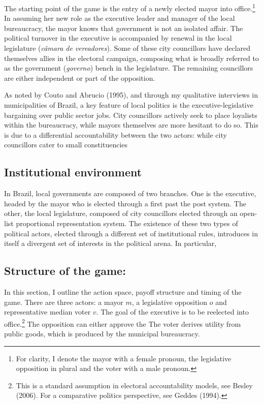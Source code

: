 \documentclass[12pt,]{article}
\let\rmarkdownfootnote\footnote%
\def\footnote{\protect\rmarkdownfootnote}
\begin{document}
The starting point of the game is the entry of a newly elected mayor
into office.\footnote{For clarity, I denote the mayor with a female
  pronoun, the legislative opposition in plural and the voter with a
  male pronoun.} In assuming her new role as the executive leader and
manager of the local bureaucracy, the mayor knows that government is not
an isolated affair. The political turnover in the executive is
accompanied by renewal in the local legislature (\emph{câmara de
vereadores}). Some of these city councillors have declared themselves
allies in the electoral campaign, composing what is broadly referred to
as the government (\emph{governo}) bench in the legislature. The
remaining councillors are either independent or part of the opposition.

As noted by Couto and Abrucio (1995), and through my qualitative
interviews in municipalities of Brazil, a key feature of local politics
is the executive-legislative bargaining over public sector jobs. City
councillors actively seek to place loyalists within the bureaucracy,
while mayors themselves are more hesitant to do so. This is due to a
differential accountability between the two actors: while city
councillors cater to small constituencies

\hypertarget{institutional-environment}{%
\subsection{Institutional environment}\label{institutional-environment}}

In Brazil, local governments are composed of two branches. One is the
executive, headed by the mayor who is elected through a first past the
post system. The other, the local legislature, composed of city
councillors elected through an open-list proportional representation
system. The existence of these two types of political actors, elected
through a different set of institutional rules, introduces in itself a
divergent set of interests in the political arena. In particular,

\hypertarget{structure-of-the-game}{%
\subsection{Structure of the game:}\label{structure-of-the-game}}

In this section, I outline the action space, payoff structure and timing
of the game. There are three actors: a mayor \(m\), a legislative
opposition \(o\) and representative median voter \(v\). The goal of the
executive is to be reelected into office.\footnote{This is a standard
  assumption in electoral accountability models, see Besley (2006). For
  a comparative politics perspective, see Geddes (1994).} The opposition
can either approve the The voter derives utility from public goods,
which is produced by the municipal bureaucracy.
\end{document}
